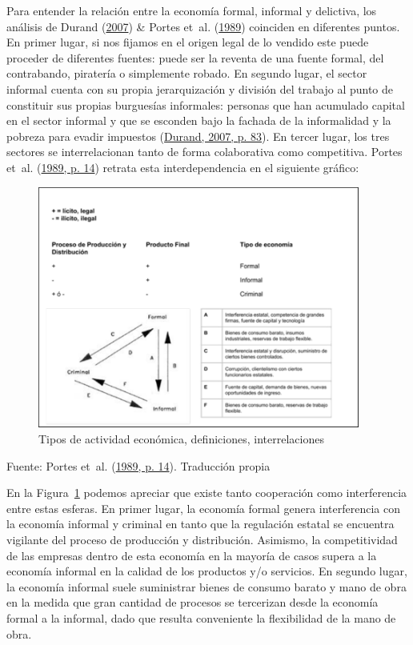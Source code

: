 \documentclass[
  letterpaper,
  12pt,
  oneside,
  spanish,
  doublespacing,
  headsepline,
  parskip]{MastersDoctoralThesis}
\begin{document}
Para entender la relación entre la economía formal, informal y
delictiva, los análisis de Durand
(\protect\hyperlink{ref-durand2007}{2007}) \& Portes et~al.
(\protect\hyperlink{ref-theinfo1989}{1989}) coinciden en diferentes
puntos. En primer lugar, si nos fijamos en el origen legal de lo vendido
este puede proceder de diferentes fuentes: puede ser la reventa de una
fuente formal, del contrabando, piratería o simplemente robado. En
segundo lugar, el sector informal cuenta con su propia jerarquización y
división del trabajo al punto de constituir sus propias burguesías
informales: personas que han acumulado capital en el sector informal y
que se esconden bajo la fachada de la informalidad y la pobreza para
evadir impuestos (\protect\hyperlink{ref-durand2007}{Durand, 2007, p.
83}). En tercer lugar, los tres sectores se interrelacionan tanto de
forma colaborativa como competitiva. Portes et~al.
(\protect\hyperlink{ref-theinfo1989}{1989, p. 14}) retrata esta
interdependencia en el siguiente gráfico:

\begin{figure}

\caption{\label{fig-esquema}Tipos de actividad económica, definiciones,
interrelaciones}

{\centering \includegraphics[width=4.16667in,height=\textheight]{Chapters/../Figures/portes_informal.pdf}

}

\end{figure}

\noindent \small Fuente: Portes et~al.
(\protect\hyperlink{ref-theinfo1989}{1989, p. 14}). Traducción propia
\normalsize

En la Figura~\ref{fig-esquema} podemos apreciar que existe tanto
cooperación como interferencia entre estas esferas. En primer lugar, la
economía formal genera interferencia con la economía informal y criminal
en tanto que la regulación estatal se encuentra vigilante del proceso de
producción y distribución. Asimismo, la competitividad de las empresas
dentro de esta economía en la mayoría de casos supera a la economía
informal en la calidad de los productos y/o servicios. En segundo lugar,
la economía informal suele suministrar bienes de consumo barato y mano
de obra en la medida que gran cantidad de procesos se tercerizan desde
la economía formal a la informal, dado que resulta conveniente la
flexibilidad de la mano de obra.
\end{document}
